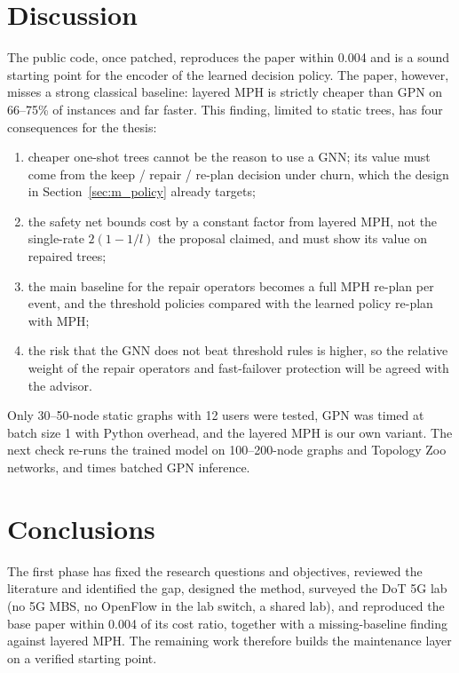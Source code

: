 \section{Discussion}\label{sec:r_discussion}
\noindent The public code, once patched, reproduces the paper within 0.004 and is a sound starting point for the encoder of the learned decision policy. The paper, however, misses a strong classical baseline: layered MPH is strictly cheaper than GPN on 66--75\% of instances and far faster. This finding, limited to static trees, has four consequences for the thesis:
\begin{enumerate}
    \item cheaper one-shot trees cannot be the reason to use a GNN; its value must come from the keep / repair / re-plan decision under churn, which the design in Section~\ref{sec:m_policy} already targets;
    \item the safety net bounds cost by a constant factor from layered MPH, not the single-rate $2(1-1/l)$ the proposal claimed, and must show its value on repaired trees;
    \item the main baseline for the repair operators becomes a full MPH re-plan per event, and the threshold policies compared with the learned policy re-plan with MPH;
    \item the risk that the GNN does not beat threshold rules is higher, so the relative weight of the repair operators and fast-failover protection will be agreed with the advisor.
\end{enumerate}
\noindent Only 30--50-node static graphs with 12 users were tested, GPN was timed at batch size 1 with Python overhead, and the layered MPH is our own variant. The next check re-runs the trained model on 100--200-node graphs and Topology Zoo networks, and times batched GPN inference.

\section{Conclusions}\label{sec:c_conclusions}
\noindent The first phase has fixed the research questions and objectives, reviewed the literature and identified the gap, designed the method, surveyed the DoT 5G lab (no 5G MBS, no OpenFlow in the lab switch, a shared lab), and reproduced the base paper within 0.004 of its cost ratio, together with a missing-baseline finding against layered MPH. The remaining work therefore builds the maintenance layer on a verified starting point.

